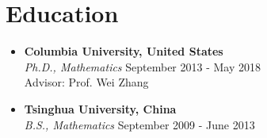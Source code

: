\documentclass[a4paper,10pt]{article}
\begin{document}
\section*{Education}
\begin{itemize}
    \item \textbf{Columbia University, United States} \\
    \textit{Ph.D., Mathematics} \hfill September 2013 - May 2018 \\
    Advisor: Prof. Wei Zhang
    \item \textbf{Tsinghua University, China} \\
    \textit{B.S., Mathematics} \hfill September 2009 - June 2013 \\
\end{itemize}
\end{document}
